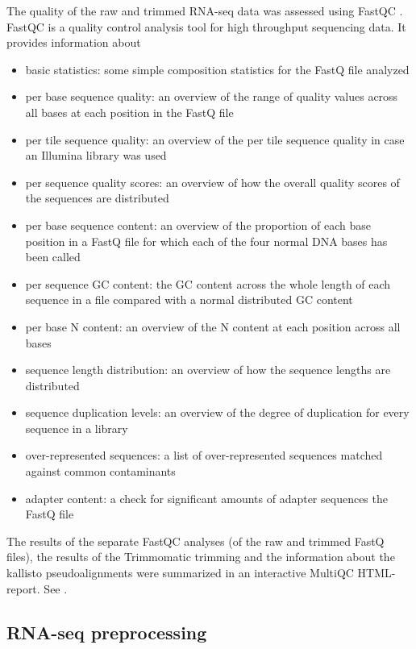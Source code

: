 The quality of the raw and trimmed RNA-seq data was assessed using FastQC \autocite{babraham}. FastQC is a quality control analysis tool for high throughput sequencing data. It provides information about
\begin{itemize}
    \item basic statistics: some simple composition statistics for the FastQ file analyzed
    \item per base sequence quality: an overview of the range of quality values across all bases at each position in the FastQ file
    \item per tile sequence quality: an overview of the per tile sequence quality in case an Illumina library was used
    \item per sequence quality scores: an overview of how the overall quality scores of the sequences are distributed
    \item per base sequence content: an overview of the proportion of each base position in a FastQ file for which each of the four normal DNA bases has been called
    \item per sequence GC content: the GC content across the whole length of each sequence in a file compared with a normal distributed GC content
    \item per base N content: an overview of the N content at each position across all bases
    \item sequence length distribution: an overview of how the sequence lengths are distributed
    \item sequence duplication levels: an overview of the degree of duplication for every sequence in a library
    \item over-represented sequences: a list of over-represented sequences matched against common contaminants
    \item adapter content: a check for significant amounts of adapter sequences the FastQ file
\end{itemize}

The results of the separate FastQC analyses (of the raw and trimmed FastQ files), the results of the Trimmomatic trimming and the information about the kallisto pseudoalignments were summarized in an interactive MultiQC HTML-report. See \autocite{10.1093/bioinformatics/btw354}.


\subsection{RNA-seq preprocessing}

